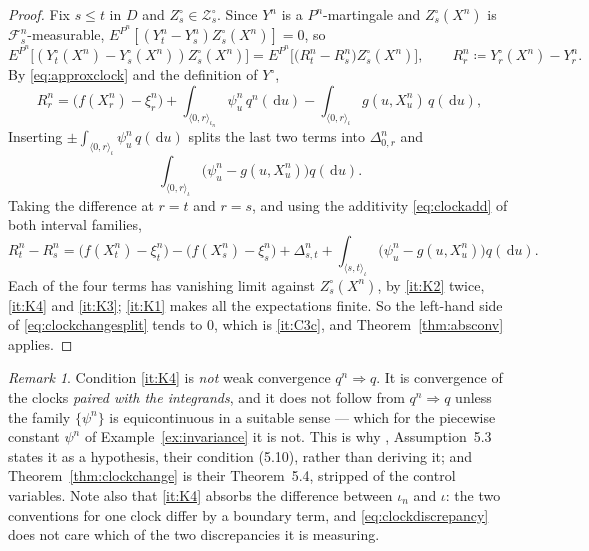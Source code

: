 \documentclass[11pt,a4paper]{article}
\theoremstyle{plain}
\theoremstyle{definition}
\theoremstyle{remark}
\newtheorem{remark}[theorem]{Remark}
\newcommand{\Filt}{\mathcal{F}}
\newcommand{\ZZ}{\mathcal{Z}}                  %
\newcommand{\dif}{\,\mathrm{d}}
\newcommand{\CPS}{\cite{CPS23}}
\begin{document}
\begin{proof}
  Fix $s \leq t$ in $D$ and $Z^\circ_s \in \ZZ^\circ_s$.  Since $Y^n$ is a
  $P^n$-martingale and $Z^\circ_s(X^n)$ is $\Filt^n_s$-measurable,
  $E^{P^n}[(Y^n_t - Y^n_s) Z^\circ_s(X^n)] = 0$, so
  \begin{equation}
    \label{eq:clockchangesplit}
    E^{P^n}\bigl[ (Y^\circ_t(X^n) - Y^\circ_s(X^n)) Z^\circ_s(X^n) \bigr]
      = E^{P^n}\bigl[ \bigl( R^n_t - R^n_s \bigr) Z^\circ_s(X^n) \bigr] ,
    \qquad R^n_r \coloneqq Y^\circ_r(X^n) - Y^n_r .
  \end{equation}
  By \eqref{eq:approxclock} and the definition of $Y^\circ$,
  \[
    R^n_r = \bigl( f(X^n_r) - \xi^n_r \bigr)
      + \int_{\langle 0,r \rangle_{\iota_n}} \psi^n_u \, q^n(\dif u)
      - \int_{\langle 0,r \rangle_{\iota}} g(u,X^n_u) \, q(\dif u) ,
  \]
  Inserting $\pm \int_{\langle 0,r \rangle_\iota} \psi^n_u \, q(\dif u)$ splits the
  last two terms into $\Delta^n_{0,r}$ and
  \[
    \int_{\langle 0,r \rangle_\iota} \bigl( \psi^n_u - g(u,X^n_u) \bigr) q(\dif u) .
  \]
  Taking the difference at $r=t$ and $r=s$, and using the additivity
  \eqref{eq:clockadd} of both interval families,
  \[
    R^n_t - R^n_s = \bigl( f(X^n_t) - \xi^n_t \bigr) - \bigl( f(X^n_s) - \xi^n_s \bigr)
      + \Delta^n_{s,t}
      + \int_{\langle s,t \rangle_\iota} \bigl( \psi^n_u - g(u,X^n_u) \bigr) q(\dif u) .
  \]
  Each of the four terms has vanishing limit against $Z^\circ_s(X^n)$, by
  \ref{it:K2} twice, \ref{it:K4} and \ref{it:K3}; \ref{it:K1} makes all the
  expectations finite.  So the left-hand side of \eqref{eq:clockchangesplit}
  tends to $0$, which is \ref{it:C3c}, and Theorem~\ref{thm:absconv} applies.
\end{proof}

\begin{remark}
  \label{rem:K4isnotweak}
  Condition \ref{it:K4} is \emph{not} weak convergence $q^n \Rightarrow q$.  It is
  convergence of the clocks \emph{paired with the integrands}, and it does not
  follow from $q^n \Rightarrow q$ unless the family $\{\psi^n\}$ is equicontinuous
  in a suitable sense --- which for the piecewise constant $\psi^n$ of
  Example~\ref{ex:invariance} it is not.  This is why \CPS, Assumption~5.3 states
  it as a hypothesis, their condition (5.10), rather than deriving it; and
  Theorem~\ref{thm:clockchange} is their Theorem~5.4, stripped of the control
  variables.  Note also that \ref{it:K4} absorbs the difference between $\iota_n$
  and $\iota$: the two conventions for one clock differ by a boundary term, and
  \eqref{eq:clockdiscrepancy} does not care which of the two discrepancies it is
  measuring.
\end{remark}
\end{document}
